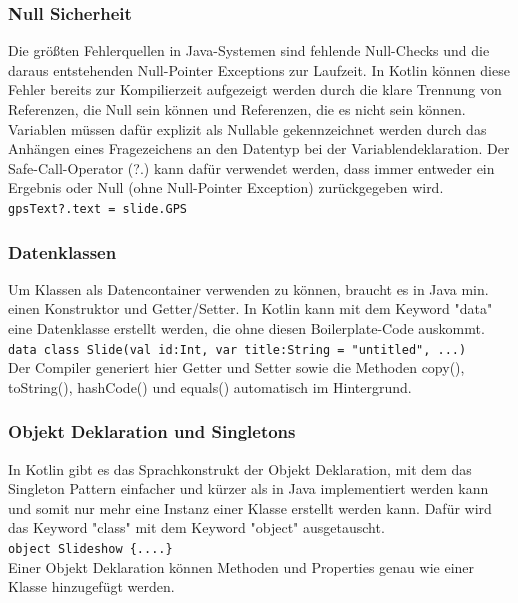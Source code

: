 \documentclass{sigchi-ext}
\begin{document}
\subsubsection{Null Sicherheit}
Die größten Fehlerquellen in Java-Systemen sind fehlende Null-Checks und die daraus entstehenden Null-Pointer Exceptions zur Laufzeit. In Kotlin können diese Fehler bereits zur Kompilierzeit aufgezeigt werden durch die klare Trennung von Referenzen, die Null sein können und Referenzen, die es nicht sein können. Variablen müssen dafür explizit als Nullable gekennzeichnet werden durch das Anhängen eines Fragezeichens an den Datentyp bei der Variablendeklaration. Der Safe-Call-Operator (?.) kann dafür verwendet werden, dass immer entweder ein Ergebnis oder Null (ohne Null-Pointer Exception) zurückgegeben wird. \cite{moskala2017android} \\ \texttt{gpsText?.text = slide.GPS} \\ 

\subsubsection{Datenklassen}
Um Klassen als Datencontainer verwenden zu können, braucht es in Java min. einen Konstruktor und Getter/Setter. In Kotlin kann mit dem Keyword "data" eine Datenklasse erstellt werden, die ohne diesen Boilerplate-Code auskommt. \\ \texttt{data class Slide(val id:Int,
                 var title:String = "untitled", ...)} \\ Der Compiler generiert hier Getter und Setter sowie die Methoden copy(), toString(), hashCode() und equals() automatisch im Hintergrund.
\cite{samuel2017programming} 

\subsubsection{Objekt Deklaration und Singletons}
In Kotlin gibt es das Sprachkonstrukt der Objekt Deklaration, mit dem das Singleton Pattern einfacher und kürzer als in Java implementiert werden kann und somit nur mehr eine Instanz einer Klasse erstellt werden kann. Dafür wird das Keyword "class" mit dem Keyword "object" ausgetauscht. \\\texttt{object Slideshow \{....\}} \\Einer Objekt Deklaration können Methoden und Properties genau wie einer Klasse hinzugefügt werden. \cite{moskala2017android} 
\end{document}
